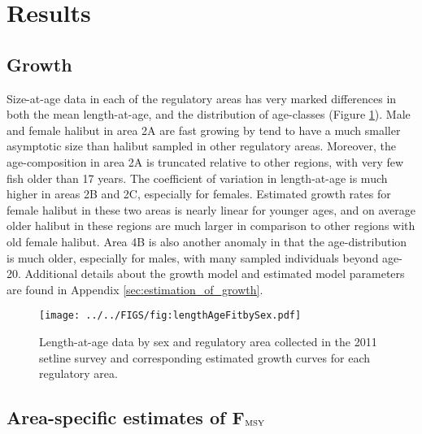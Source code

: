 \section*{Results} %
\label{sec:results}

\subsection*{Growth} %
\label{sub:growth}

Size-at-age data in each of the regulatory areas has very marked differences in both the mean length-at-age, and the distribution of age-classes (Figure \ref{fig:FIGS_fig:lengthAgeFitbySex}). Male and female halibut in area 2A are fast growing by tend to have a much smaller asymptotic size than halibut sampled in other regulatory areas.  Moreover, the age-composition in area 2A is truncated relative to other regions, with very few fish older than 17 years.  The coefficient of variation in length-at-age is much higher in areas 2B and 2C, especially for females.  Estimated growth rates for female halibut in these two areas is nearly linear for younger ages, and on average older halibut in these regions are much larger in comparison to other regions with old female halibut.  Area 4B is also another anomaly in that the age-distribution is much older, especially for males, with many sampled individuals beyond age-20.  Additional details about the growth model and estimated model parameters are found in Appendix \ref{sec:estimation_of_growth}.

\begin{figure}[htbp]
	\centering
		\texttt{[image: ../../FIGS/fig:lengthAgeFitbySex.pdf]}
	\caption{Length-at-age data by sex and regulatory area collected in the 2011 setline survey and corresponding estimated growth curves for each regulatory area.}
	\label{fig:FIGS_fig:lengthAgeFitbySex}
\end{figure}

\subsection*{Area-specific estimates of F$_{\rm{MSY}}$} %
\label{sub:area_specific_estimates_of_FMSY}

